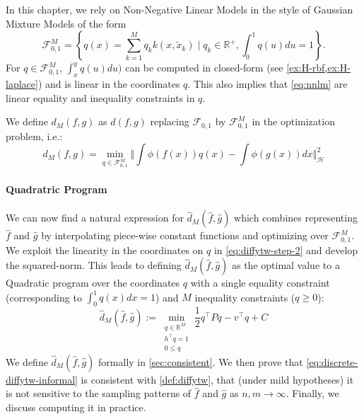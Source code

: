 In this chapter, we rely on Non-Negative Linear Models in the style of Gaussian Mixture Models of the form
\begin{equation}\label{eq:nnlm}
\mathcal F_{0,1}^M = \left\lbrace q(x) = \sum_{k=1}^M q_k k(x, \tilde x_k) \mid q_k\in\mathbb R^+, \int_0^1q(u)du=1\right\rbrace.
\end{equation}
For $q\in\mathcal F_{0,1}^M$, $\int_x^y q(u)du)$ can be computed in closed-form (see \cref{ex:H-rbf,ex:H-laplace}) and is linear in the coordinates $q$. This also implies that \cref{eq:nnlm} are linear equality and inequality constraints in $q$.

We define $d_M(f, g)$ as $d(f,g)$ replacing $\mathcal F_{0,1}$ by $\mathcal F_{0,1}^M$ in the optimization problem, i.e.:
\begin{equation}\label{eq:hat-d_M}
d_M(f, g) = \min_{q \in\mathcal F_{0,1}^M} \Vert \int \phi(f(x))q(x) - \int \phi(g(x))dx\Vert_\mathcal H^2
\end{equation}


\paragraph{Quadratric Program} We can now find a natural expression for $\hat d_M(\hat f, \hat g)$ which combines representing $\hat f$ and $\hat g$ by interpolating piece-wise constant functions and optimizing over $\mathcal F_{0,1}^M$. We exploit the linearity in the coordinates on $q$ in \cref{eq:diffytw-step-2} and develop the squared-norm. This leads to defining $\hat d_M(\hat f, \hat g)$ as the optimal value to a Quadratic program over the coordinates $q$ with a single equality constraint (corresponding to $\int_0^1q(x)dx = 1$) and $M$ inequality constraints ($q \geq 0$):
\begin{equation}\label{eq:discrete-diffytw-informal}
\hat d_M(\hat f, \hat g) :=\min_{\substack{q\in\mathbb R^{M}\\h^\top q=1\\0 \leq q}}\frac{1}{2}q^\top Pq - v^\top q + C
\end{equation}
We define $\hat d_M(\hat f, \hat g)$ formally in \cref{sec:consistent}. We then prove that \cref{eq:discrete-diffytw-informal} is consistent with \cref{def:diffytw}, that (under mild hypotheses) it is not sensitive to the sampling patterns of $\hat f$ and $\hat g$ as $n, m\to\infty$. Finally, we discuss computing it in practice.

